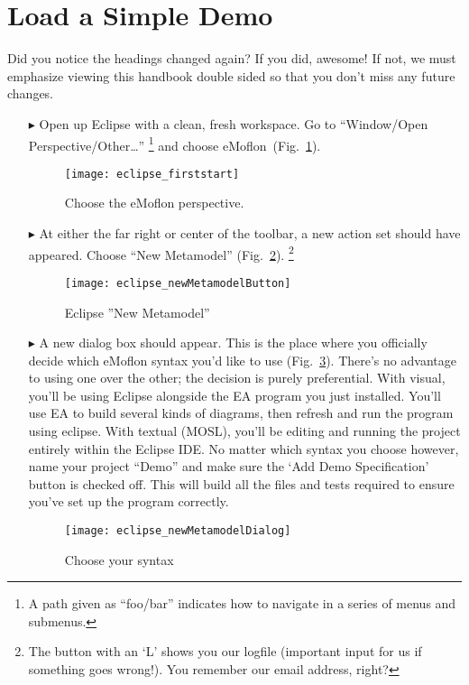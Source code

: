 \newpage
\genHeader

\section{Load a Simple Demo}

Did you notice the headings changed again? If you did, awesome! If not, we must emphasize viewing this handbook double sided so that you don't miss any future changes.

\begin{itemize}
\item[$\blacktriangleright$] Open up Eclipse with a clean, fresh workspace. Go to ``Window/Open Perspective/Other\ldots'' \footnote{A path given as ``foo/bar'' indicates how to navigate in a series of menus and submenus.} and choose eMoflon~(Fig.~\ref{fig_eclipse}).

\begin{figure}[htbp]
	\centering
  \texttt{[image: eclipse\_firststart]}
	\caption{Choose the eMoflon perspective.}
	\label{fig_eclipse}
\end{figure} 

\item[$\blacktriangleright$] At either the far right or center of the toolbar, a new action set should have appeared. Choose ``New Metamodel'' (Fig.~\ref{fig_eclipseNewMetamodelButton}).
\footnote{The button with an `L' shows you our logfile (important input for us if something goes wrong!). You remember our email address, right?}

\begin{figure}[htbp]
	\centering
  \texttt{[image: eclipse\_newMetamodelButton]}
	\caption{Eclipse ''New Metamodel''}
	\label{fig_eclipseNewMetamodelButton}
\end{figure}

\item[$\blacktriangleright$] A new dialog box should appear. This is the place where you officially decide which eMoflon syntax you'd like to use (Fig.~\ref{fig_chooseSyntax}). There's no advantage to using one over the other; the decision is purely preferential. With visual, you'll be using Eclipse alongside the EA program you just installed. You'll use EA to build several kinds of diagrams, then refresh and run the program using eclipse. With textual (MOSL), you'll be editing and running the project entirely within the Eclipse IDE. No matter which syntax you choose however, name your project ``Demo'' and make sure the `Add Demo Specification' button is checked off. This will build all the files and tests required to ensure you've set up the program correctly.  

\vspace{1cm}

\begin{figure}[htbp]
	\centering
  \texttt{[image: eclipse\_newMetamodelDialog]}
	\caption{Choose your syntax}
	\label{fig_chooseSyntax}
\end{figure} 
\end{itemize}



